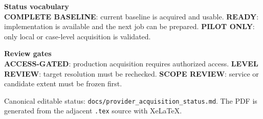 \documentclass[9pt,a4paper]{article}
\begin{document}
\vspace{1mm}
\begin{minipage}[t]{0.49\textwidth}
\small\textbf{Status vocabulary}\\[-1mm]
\footnotesize
\textbf{COMPLETE BASELINE}: current baseline is acquired and usable.\quad
\textbf{READY}: implementation is available and the next job can be prepared.\quad
\textbf{PILOT ONLY}: only local or case-level acquisition is validated.
\end{minipage}\hfill
\begin{minipage}[t]{0.49\textwidth}
\small\textbf{Review gates}\\[-1mm]
\footnotesize
\textbf{ACCESS-GATED}: production acquisition requires authorized access.\quad
\textbf{LEVEL REVIEW}: target resolution must be rechecked.\quad
\textbf{SCOPE REVIEW}: service or candidate extent must be frozen first.
\end{minipage}

\vfill
\footnotesize\color{muted}
Canonical editable status: \texttt{docs/provider\_acquisition\_status.md}. The PDF is generated from the adjacent \texttt{.tex} source with XeLaTeX.
\end{document}
